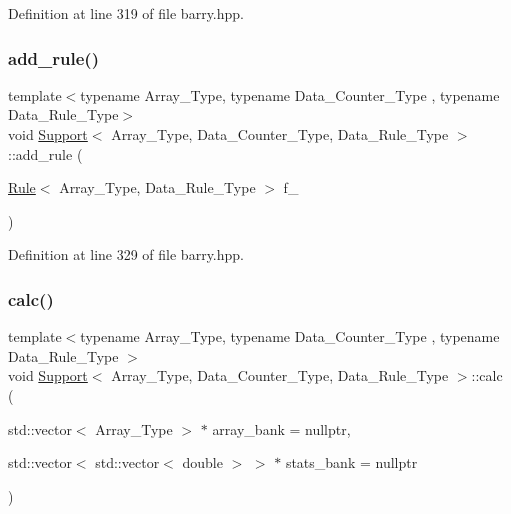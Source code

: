 Definition at line 319 of file barry.\+hpp.

\mbox{\label{classbarry_1_1_support_aa817cb5d6c48dda3ecfeef2c5897b537}} 
\subsubsection{\texorpdfstring{add\+\_\+rule()}{add\_rule()}\hspace{0.1cm}{\footnotesize\ttfamily [2/2]}}
{\footnotesize\ttfamily template$<$typename Array\+\_\+\+Type, typename Data\+\_\+\+Counter\+\_\+\+Type , typename Data\+\_\+\+Rule\+\_\+\+Type$>$ \\
void \hyperlink{classbarry_1_1_support}{Support}$<$ Array\+\_\+\+Type, Data\+\_\+\+Counter\+\_\+\+Type, Data\+\_\+\+Rule\+\_\+\+Type $>$\+::add\+\_\+rule (\begin{DoxyParamCaption}\item[{\hyperlink{classbarry_1_1_rule}{Rule}$<$ Array\+\_\+\+Type, Data\+\_\+\+Rule\+\_\+\+Type $>$}]{f\+\_\+ }\end{DoxyParamCaption})\hspace{0.3cm}{\ttfamily [inline]}}



Definition at line 329 of file barry.\+hpp.

\mbox{\label{classbarry_1_1_support_afa36b8c1348e28c51296379157f58081}} 
\subsubsection{\texorpdfstring{calc()}{calc()}}
{\footnotesize\ttfamily template$<$typename Array\+\_\+\+Type, typename Data\+\_\+\+Counter\+\_\+\+Type , typename Data\+\_\+\+Rule\+\_\+\+Type $>$ \\
void \hyperlink{classbarry_1_1_support}{Support}$<$ Array\+\_\+\+Type, Data\+\_\+\+Counter\+\_\+\+Type, Data\+\_\+\+Rule\+\_\+\+Type $>$\+::calc (\begin{DoxyParamCaption}\item[{std\+::vector$<$ Array\+\_\+\+Type $>$ $\ast$}]{array\+\_\+bank = {\ttfamily nullptr},  }\item[{std\+::vector$<$ std\+::vector$<$ double $>$ $>$ $\ast$}]{stats\+\_\+bank = {\ttfamily nullptr} }\end{DoxyParamCaption})\hspace{0.3cm}{\ttfamily [inline]}}



